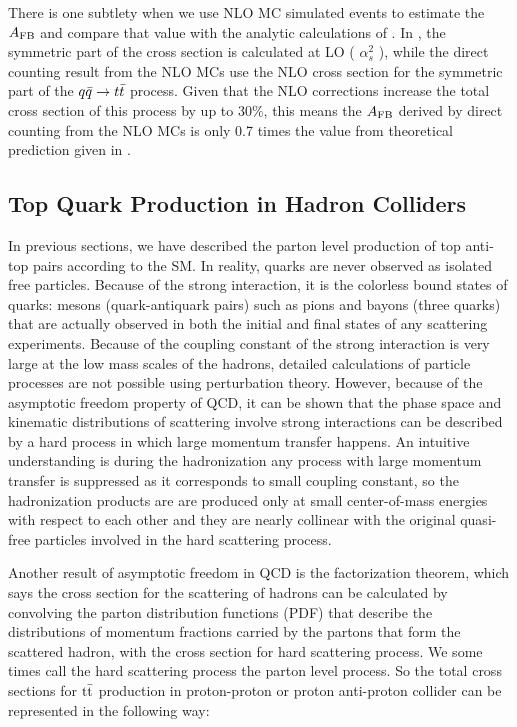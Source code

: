 There is one subtlety when we use NLO MC simulated events to estimate the $A_{\mathrm{FB}}$ and compare that value with the analytic calculations of \cite{Kuhn&Rodrigus}. In \cite{Kuhn&Rodrigus}, the symmetric part of the cross section is calculated at LO ( $\alpha_s^2$ ), while the direct counting result from the NLO MCs use the NLO cross section for the symmetric part of the $q\bar q \rightarrow t \bar t$ process.  Given that the NLO corrections increase the total cross section of this process by up to 30\%, this means the $A_{\mathrm{FB}}$ derived by direct counting from the NLO MCs is only 0.7 times the value from theoretical prediction given in \cite{Kuhn&Rodrigus}.              

\subsection{Top Quark Production in Hadron Colliders}
\label{sec:production in LHC}

In previous sections, we have described the parton level production of top anti-top pairs according to the SM. In reality, quarks are never observed as isolated free particles. Because of the strong interaction, it is the colorless bound states of quarks: mesons (quark-antiquark pairs) such as pions and bayons (three quarks) that are actually observed in both the initial and final states of any scattering experiments. Because of the coupling constant of the strong interaction is very large at the low mass scales of the hadrons, detailed calculations of particle processes are not possible using perturbation theory. However, because of the asymptotic freedom property of QCD, it can be shown that the phase space and kinematic distributions of scattering involve strong interactions can be described by a hard process in which large momentum transfer happens. An intuitive understanding is during the hadronization any process with large momentum transfer is suppressed as it corresponds to small coupling constant, so the hadronization products are are produced only at small center-of-mass energies with respect to each other and they are nearly collinear with the original quasi-free particles involved in the hard scattering process. 

Another result of asymptotic freedom in QCD is the factorization theorem, which says the cross section for the scattering of hadrons can be calculated by convolving the parton distribution functions (PDF) that describe the distributions of momentum fractions carried by the partons that form the scattered hadron,  with the cross section for hard scattering process. We some times call the hard scattering process the parton level process. So the total cross sections for $\mathrm{t}\bar{\mathrm{t}}$ production in proton-proton or proton anti-proton collider can be represented in the following way:


